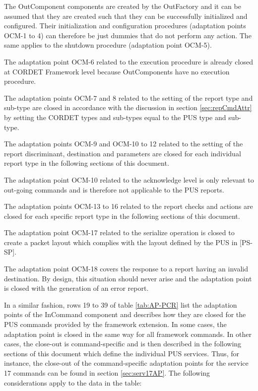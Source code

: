 \documentclass[a4paper,10pt]{article}
\newenvironment{fw_itemize}						%
{\begin{itemize}
  \setlength{\itemsep}{1mm}
  \setlength{\parskip}{0pt}
  \setlength{\parsep}{0pt}}
{\end{itemize}}
\begin{document}
\begin{fw_itemize}
\item The OutComponent components are created by the OutFactory and it can be assumed that they are created such that they can be successfully initialized and configured. Their initialization and configuration procedures (adaptation points OCM-1 to 4) can therefore be just dummies that do not perform any action. The same applies to the shutdown procedure (adaptation point OCM-5).
\item The adaptation point OCM-6 related to the execution procedure is already closed at CORDET Framework level because OutComponents have no execution procedure.
\item The adaptation points OCM-7 and 8 related to the setting of the report type and sub-type are closed in accordance with the discussion in section \ref{sec:repCmdAttr} by setting the CORDET types and sub-types equal to the PUS type and sub-type.
\item The adaptation points OCM-9 and OCM-10 to 12 related to the setting of the report discriminant, destination and parameters are closed for each individual report type in the following sections of this document.
\item The adaptation point OCM-10 related to the acknowledge level is only relevant to out-going commands and is therefore not applicable to the PUS reports.
\item The adaptation points OCM-13 to 16 related to the report checks and actions are closed for each specific report type in the following sections of this document.
\item The adaptation point OCM-17 related to the serialize operation is closed to create a packet layout which complies with the layout defined by the PUS in [PS-SP].
\item The adaptation point OCM-18 covers the response to a report having an invalid destination. By design, this situation should never arise and the adaptation point is closed with the generation of an error report.
\end{fw_itemize}

In a similar fashion, rows 19 to 39 of table \ref{tab:AP-PCR} list the adaptation points of the InCommand component and describes how they are closed for the PUS commands provided by the framework extension. In some cases, the adaptation point is closed in the same way for all framework commands. In other cases, the close-out is command-specific and is then described in the following sections of this document which define the individual PUS services. Thus, for instance, the close-out of the command-specific adaptation points for the service 17 commands can be found in section \ref{sec:serv17AP}. The following considerations apply to the data in the table:
\end{document}
